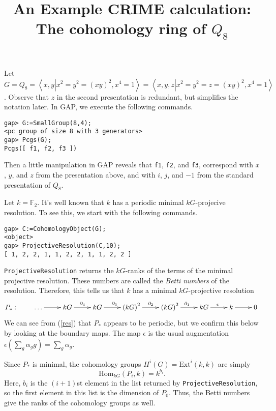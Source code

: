 \documentclass[12pt]{article}
\title{An Example \textsf{CRIME} calculation: 
The cohomology ring of $Q_8$}\author{}
\begin{document}
\maketitle

Let $G=Q_8=\left\langle x,y\left|
x^2=y^2=\left(xy\right)^2,x^4=1\right.\right\rangle
=\left\langle x,y,z\left|
x^2=y^2=z=\left(xy\right)^2,x^4=1\right.\right\rangle$.
Observe that $z$ in the second presentation is redundant,
but simplifies the notation later. In \textsf{GAP}, we execute
the following commands.
\begin{verbatim}
gap> G:=SmallGroup(8,4);
<pc group of size 8 with 3 generators>
gap> Pcgs(G);
Pcgs([ f1, f2, f3 ])
\end{verbatim}
Then a little manipulation in \textsf{ GAP}
reveals that \verb!f1!, \verb!f2!, and \verb!f3!,
correspond with $x$, $y$, and $z$
from the presentation above, and with $i$,
$j$, and $-1$ from the standard presentation 
of $Q_8$.

Let $k=\mathbb{F}_2$. It's well known that $k$
has a periodic minimal $kG$-projecive resolution.
To see this, we start with the following commands.

\begin{verbatim}
gap> C:=CohomologyObject(G);
<object>
gap> ProjectiveResolution(C,10);
[ 1, 2, 2, 1, 1, 2, 2, 1, 1, 2, 2 ]
\end{verbatim}

\verb!ProjectiveResolution! returns the $kG$-ranks
of the terms of the minimal projective resolution.
These numbers are called the {\em Betti numbers}
of the resolution.
Therefore, this tells us that $k$ has a minimal 
$kG$-projective resolution 
\begin{equation}\label{res}
P_\ast:\qquad\begin{xy}\xymatrix{
\dots\ar[r]&kG\ar[r]^{\partial_4}
&kG\ar[r]^{\partial_3}
&\left(kG\right)^2\ar[r]^{\partial_2}
&\left(kG\right)^2\ar[r]^{\partial_1}
&kG\ar[r]^{\epsilon}
&k\ar[r]&0
}\end{xy}\end{equation}
We can see from (\ref{res}) that $P_\ast$ 
appears to be periodic, but we
confirm this below by looking at the boundary maps.
The map $\epsilon$ is the usual augmentation
$\epsilon\left(\sum_g\alpha_gg\right)
=\sum_g\alpha_g$.

Since $P_\ast$ is minimal, 
the cohomology groups $H^i\left(G\right)
=\mathrm{Ext}^i\left(k,k\right)$ are simply
\[\mathrm{Hom}_{kG}\left(P_i,k\right)=k^{b_i}.\]
Here, $b_i$ is the $\left(i+1\right)$st element
in the list returned by \verb!ProjectiveResolution!,
so the first element in this list is the dimension
of $P_0$. Thus, the Betti numbers give the 
ranks of the cohomology groups as well.
\end{document}
